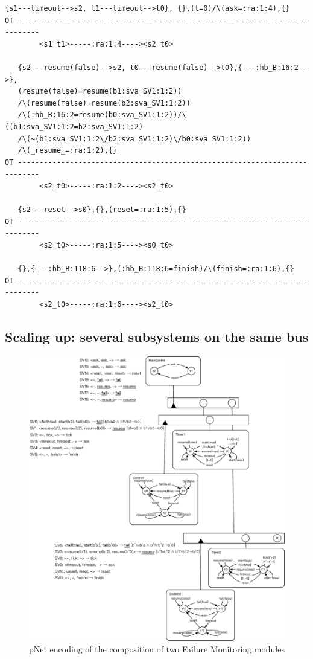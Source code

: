 \documentclass{lncs/llncs}
\begin{document}
\begin{lstlisting}[basicstyle=\scriptsize\ttfamily, frame=single]
   {s1---timeout-->s2, t1---timeout-->t0}, {},(t=0)/\(ask=:ra:1:4),{}
OT ---------------------------------------------------------------------------
        <s1_t1>-----:ra:1:4----><s2_t0>

   {s2---resume(false)-->s2, t0---resume(false)-->t0},{---:hb_B:16:2-->},   
   (resume(false)=resume(b1:sva_SV1:1:2))
   /\(resume(false)=resume(b2:sva_SV1:1:2))
   /\(:hb_B:16:2=resume(b0:sva_SV1:1:2))/\((b1:sva_SV1:1:2=b2:sva_SV1:1:2)
   /\(~(b1:sva_SV1:1:2\/b2:sva_SV1:1:2)\/b0:sva_SV1:1:2))
   /\(_resume_=:ra:1:2),{}
OT ---------------------------------------------------------------------------
        <s2_t0>-----:ra:1:2----><s2_t0>

   {s2---reset-->s0},{},(reset=:ra:1:5),{}
OT ---------------------------------------------------------------------------
        <s2_t0>-----:ra:1:5----><s0_t0>

   {},{---:hb_B:118:6-->},(:hb_B:118:6=finish)/\(finish=:ra:1:6),{}
OT ---------------------------------------------------------------------------
        <s2_t0>-----:ra:1:6----><s2_t0>
\end{lstlisting}

\newpage
\subsection{Scaling up: several subsystems on the same bus}
\label{appendix:scalingup}

\begin{figure}
    \centerline{\includegraphics[width=\linewidth]{XFIG/ScaleUp}}
    \caption{pNet encoding of the composition of two Failure
      Monitoring modules}  \label{schema:scaleup} 
\end{figure}
\end{document}
